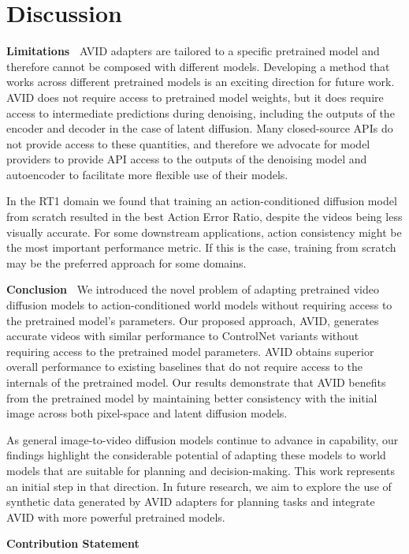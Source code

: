 \section{Discussion}
\textbf{Limitations\ } AVID adapters are tailored to a specific pretrained model and therefore cannot be composed with different models. Developing a method that works across different pretrained models is an exciting direction for future work.
%
AVID does not require access to pretrained model weights, but it does require access to intermediate predictions during denoising, including the outputs of the encoder and decoder in the case of latent diffusion.  Many closed-source APIs do not provide access to these quantities, and therefore we advocate for model providers to provide API access to the outputs of the denoising model and autoencoder to facilitate more flexible use of their models.
%

In the RT1 domain we found that training an action-conditioned diffusion model from scratch resulted in the best Action Error Ratio, despite the videos being less visually accurate. For some downstream applications, action consistency might be the most important performance metric. If this is the case, training from scratch may be the preferred approach for some domains.


\textbf{Conclusion\ } We introduced the novel problem of adapting pretrained video diffusion models to action-conditioned world models without requiring access to the pretrained model's parameters. Our proposed approach, AVID, generates accurate videos with similar performance to ControlNet variants without requiring access to the pretrained model parameters. AVID obtains superior overall performance to existing baselines that do not require access to the internals of the pretrained model. Our results demonstrate that AVID benefits from the pretrained model by maintaining better consistency with the initial image across both pixel-space and latent diffusion models. 

As general image-to-video diffusion models continue to advance in capability, our findings highlight the considerable potential of adapting these models to  world models that are suitable for planning and decision-making. This work represents an initial step in that direction. In future research, we aim to explore the use of synthetic data generated by AVID adapters for planning tasks and integrate AVID with more powerful pretrained models.

\vfill
{\large\textbf{Contribution Statement}}

